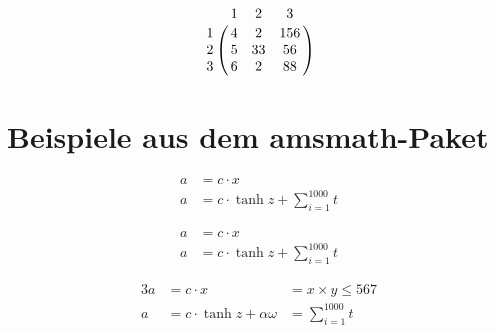 \documentclass[12pt,ngerman,parskip=half]{scrartcl}
\begin{document}
\[
\bordermatrix{
   & 1 & 2 & 3 \cr
1 & 4 & 2 & 156 \cr
2 & 5 & 33 & 56 \cr
3 & 6 & 2 & 88 \cr
}
\]

\section{Beispiele aus dem amsmath-Paket}

\begin{align}
a &= c \cdot x \\
a &= c \cdot \tanh z + \sum_{i=1}^{1000} t
\end{align}

\begin{align*}
a &= c \cdot x \\
a &= c \cdot \tanh z + \sum_{i=1}^{1000} t
\end{align*}

\begin{alignat}{3}
a &= c \cdot x &= x\times y \leq 567 \\
a &= c \cdot \tanh z + \alpha\omega &= \sum_{i=1}^{1000} t
\end{alignat}
\end{document}
